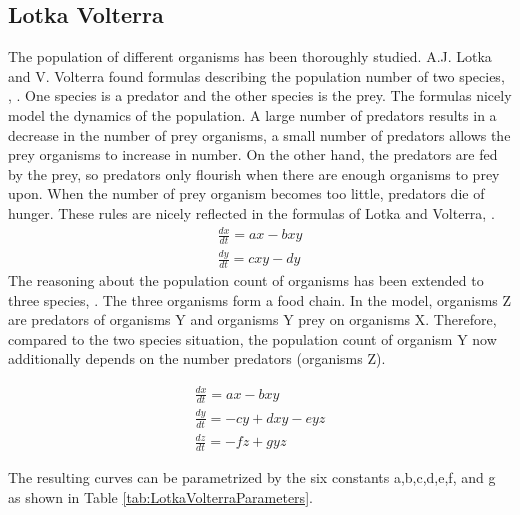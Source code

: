 \documentclass[11pt]{article}
\begin{document}
\subsection{Lotka Volterra}
The population of different organisms has been thoroughly studied. A.J. Lotka and V. Volterra found formulas describing the population number of two species, \cite{lotka}, \cite{volterra}. One species is a predator and the other species is the prey. The formulas nicely model the dynamics of the population. A large number of predators results in a decrease in the number of prey organisms, a small number of predators allows the prey organisms to increase in number. On the other hand, the predators are fed by the prey, so predators only flourish when there are enough organisms to prey upon. When the number of prey organism becomes too little, predators die of hunger. These rules are nicely reflected in the formulas of Lotka and Volterra, \cite{lotkaVolterra}.\\

\begin{equation}
\begin{split}
\frac{dx}{dt} = ax-bxy \\ 
\frac{dy}{dt} = cxy-dy
\end{split}
\end{equation}
The reasoning about the population count of organisms has been extended to three species, \cite{lotkaVolterraThreeSpecies}. The three organisms form a food chain. In the model, organisms Z are predators of organisms Y and organisms Y prey on organisms X. Therefore, compared to the two species situation, the population count of organism Y now additionally depends on the number predators (organisms Z). 

\begin{equation}
\begin{split}
\frac{dx}{dt} = ax-bxy \\ 
\frac{dy}{dt} = -cy+dxy-eyz \\ 
\frac{dz}{dt} = -fz+gyz
\end{split}
\end{equation}

The resulting curves can be parametrized by the six constants a,b,c,d,e,f, and g as shown in Table \ref{tab:LotkaVolterraParameters}.
\end{document}
